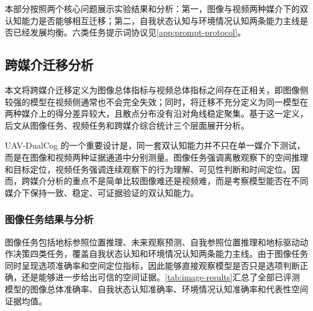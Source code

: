 本部分按照两个核心问题展示实验结果和分析：第一，图像与视频两种媒介下的双认知能力是否能够相互迁移；第二，自我状态认知与环境情况认知两条能力主线是否已经发展均衡。六类任务提示词协议见\autoref{app:prompt-protocol}。

\newcommand{\resultgroup}[2]{\midrule\multicolumn{#1}{c}{#2} \\ \midrule}

\subsection{跨媒介迁移分析}

本文将跨媒介迁移定义为图像总体指标与视频总体指标之间存在正相关，即图像侧较强的模型在视频侧通常也不会完全失效；同时，将迁移不充分定义为同一模型在两种媒介上的得分差异较大，且散点分布没有沿对角线稳定聚集。基于这一定义，后文从图像任务、视频任务和跨媒介综合统计三个层面展开分析。

UAV-DualCog 的一个重要设计是，同一套双认知能力并不只在单一媒介下测试，而是在图像和视频两种证据通道中分别测量。图像任务强调离散观察下的空间推理和目标定位，视频任务强调连续观察下的行为理解、可见性判断和时间定位。因而，跨媒介分析的重点不是简单比较图像难还是视频难，而是考察模型能否在不同媒介下保持一致、稳定、可证据验证的双认知能力。

\subsubsection{图像任务结果与分析}

图像任务包括地标参照位置推理、未来观察预测、自我参照位置推理和地标驱动动作决策四类任务，覆盖自我状态认知和环境情况认知两条能力主线。由于图像任务同时呈现选项准确率和空间定位指标，因此能够直接观察模型是否只是选项判断正确，还是能够进一步给出可信的空间证据。\autoref{tab:image-results}汇总了全部已评测模型的图像总体准确率、自我状态认知准确率、环境情况认知准确率和代表性空间证据均值。

